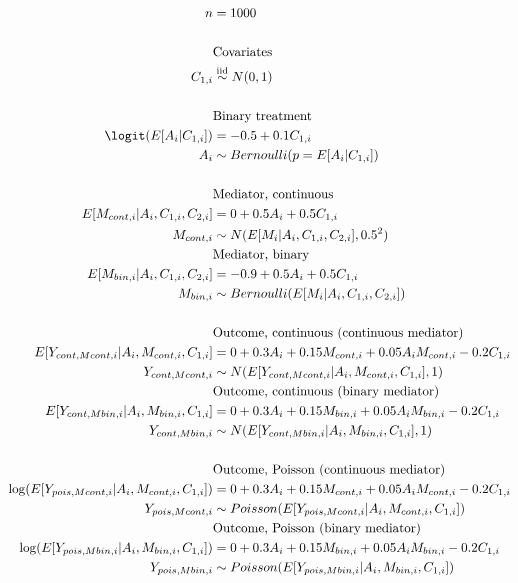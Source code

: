 \documentclass[dvipdfmx,10pt]{article}
\begin{document}
\begin{align*}
  n
  &= 1000\\
  \\
  &\text{Covariates}\\
  C_{1,i} &\overset{\text{iid}}{\sim} N(0,1)\\
  \\
  &\text{Binary treatment}\\
  \logit(E[A_{i} | C_{1,i}])
  &= -0.5 + 0.1 C_{1,i}\\
  A_{i} &\sim Bernoulli(p = E[A_{i} | C_{1,i}])\\
  \\
  &\text{Mediator, continuous}\\
  E[M_{cont,i} | A_{i}, C_{1,i}, C_{2,i}]
  &= 0 + 0.5 A_{i} + 0.5 C_{1,i}\\
  M_{cont,i} &\sim N(E[M_{i} | A_{i}, C_{1,i}, C_{2,i}], 0.5^{2})\\
  &\text{Mediator, binary}\\
  E[M_{bin,i} | A_{i}, C_{1,i}, C_{2,i}]
  &= -0.9 + 0.5 A_{i} + 0.5 C_{1,i}\\
  M_{bin,i} &\sim Bernoulli(E[M_{i} | A_{i}, C_{1,i}, C_{2,i}])\\
  \\
  &\text{Outcome, continuous (continuous mediator)}\\
  E[Y_{cont,Mcont,i} | A_{i}, M_{cont,i}, C_{1,i}]
  &= 0 + 0.3 A_{i} + 0.15 M_{cont,i} + 0.05 A_{i} M_{cont,i} -0.2 C_{1,i}\\
  Y_{cont,Mcont,i} &\sim N(E[Y_{cont,Mcont,i} | A_{i}, M_{cont,i}, C_{1,i}], 1)\\
  &\text{Outcome, continuous (binary mediator)}\\
  E[Y_{cont,Mbin,i} | A_{i}, M_{bin,i}, C_{1,i}]
  &= 0 + 0.3 A_{i} + 0.15 M_{bin,i} + 0.05 A_{i} M_{bin,i} -0.2 C_{1,i}\\
  Y_{cont,Mbin,i} &\sim N(E[Y_{cont,Mbin,i} | A_{i}, M_{bin,i}, C_{1,i}], 1)\\
  \\
  &\text{Outcome, Poisson (continuous mediator)}\\
  \log(E[Y_{pois,Mcont,i} | A_{i}, M_{cont,i}, C_{1,i}])
  &= 0 + 0.3 A_{i} + 0.15 M_{cont,i} + 0.05 A_{i} M_{cont,i} -0.2 C_{1,i}\\
  Y_{pois,Mcont,i} &\sim Poisson(E[Y_{pois,Mcont,i} | A_{i}, M_{cont,i}, C_{1,i}])\\
  &\text{Outcome, Poisson (binary mediator)}\\
  \log(E[Y_{pois,Mbin,i} | A_{i}, M_{bin,i}, C_{1,i}])
  &= 0 + 0.3 A_{i} + 0.15 M_{bin,i} + 0.05 A_{i} M_{bin,i} -0.2 C_{1,i}\\
  Y_{pois,Mbin,i} &\sim Poisson(E[Y_{pois,Mbin,i} | A_{i}, M_{bin,i}, C_{1,i}])\\
\end{align*}
\end{document}
